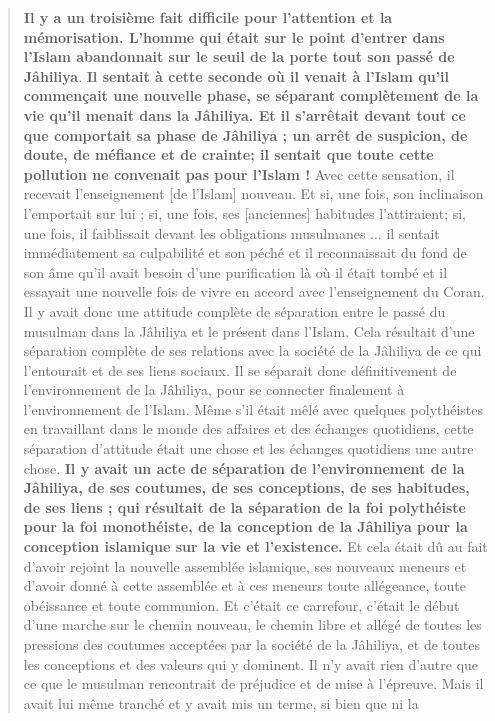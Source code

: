 \begin{quote}
    \textbf{Il y a un troisième fait difficile pour l'attention et la
mémorisation. L'homme qui était sur le point d'entrer dans l'Islam
abandonnait sur le seuil de la porte tout son passé de Jâhiliya}.
\textbf{Il sentait à cette seconde où il venait à l'Islam qu'il
commençait une nouvelle phase, se séparant complètement de la vie qu'il
menait dans la Jâhiliya. Et il s'arrêtait devant tout ce que comportait
sa phase de Jâhiliya ; un arrêt de suspicion, de doute, de méfiance et
de crainte; il sentait que toute cette pollution ne convenait pas pour
l'Islam !} Avec cette sensation, il recevait l'enseignement {[}de
l'Islam{]} nouveau. Et si, une fois, son inclinaison l'emportait sur lui
; si, une fois, ses {[}anciennes{]} habitudes l'attiraient; si, une
fois, il faiblissait devant les obligations musulmanes ... il sentait
immédiatement sa culpabilité et son péché et il reconnaissait du fond de
son âme qu'il avait besoin d'une purification là où il était tombé et il
essayait une nouvelle fois de vivre en accord avec l'enseignement du
Coran. Il y avait donc une attitude complète de séparation entre le
passé du musulman dans la Jâhiliya et le présent dans l'Islam. Cela
résultait d'une séparation complète de ses relations avec la société de
la Jâhiliya de ce qui l'entourait et de ses liens sociaux. Il se
séparait donc définitivement de l'environnement de la Jâhiliya, pour se
connecter finalement à l'environnement de l'Islam. Même s'il était mêlé
avec quelques polythéistes en travaillant dans le monde des affaires et
des échanges quotidiens, cette séparation d'attitude était une chose et
les échanges quotidiens une autre chose. \textbf{Il y avait un acte de
séparation de l'environnement de la Jâhiliya, de ses coutumes, de ses
conceptions, de ses habitudes, de ses liens ; qui résultait de la
séparation de la foi polythéiste pour la foi monothéiste, de la
conception de la Jâhiliya pour la conception islamique sur la vie et
l'existence.} Et cela était dû au fait d'avoir rejoint la nouvelle
assemblée islamique, ses nouveaux meneurs et d'avoir donné à cette
assemblée et à ces meneurs toute allégeance, toute obéissance et toute
communion. Et c'était ce carrefour, c'était le début d'une marche sur le
chemin nouveau, le chemin libre et allégé de toutes les pressions des
coutumes acceptées par la société de la Jâhiliya, et de toutes les
conceptions et des valeurs qui y dominent. Il n'y avait rien d'autre que
ce que le musulman rencontrait de préjudice et de mise à l'épreuve. Mais
il avait lui même tranché et y avait mis un terme, si bien que ni la

\end{quote}
